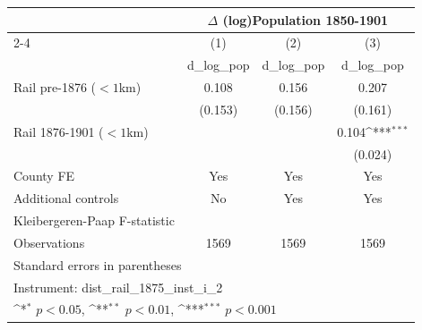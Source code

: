 {
\def\sym#1{\ifmmode^{#1}\else\(^{#1}\)\fi}
\begin{tabular}{l*{3}{c}}
\toprule
                &\multicolumn{3}{c}{$\Delta$ (log)Population 1850-1901}  \\\cmidrule(lr){2-4}
                &\multicolumn{1}{c}{(1)}&\multicolumn{1}{c}{(2)}&\multicolumn{1}{c}{(3)}\\
                &\multicolumn{1}{c}{d\_log\_pop}&\multicolumn{1}{c}{d\_log\_pop}&\multicolumn{1}{c}{d\_log\_pop}\\
\midrule
Rail pre-1876 ($<1$km)&    0.108         &    0.156         &    0.207         \\
                &  (0.153)         &  (0.156)         &  (0.161)         \\
Rail 1876-1901 ($<1$km)&                  &                  &    0.104\sym{***}\\
                &                  &                  &  (0.024)         \\
County FE       &      Yes         &      Yes         &      Yes         \\
Additional controls &       No         &      Yes         &      Yes         \\
\midrule
Kleibergeren-Paap F-statistic&                  &                  &                  \\
Observations    &     1569         &     1569         &     1569         \\
\bottomrule
\multicolumn{4}{l}{\footnotesize Standard errors in parentheses}\\
\multicolumn{4}{l}{\footnotesize Instrument: dist\_rail\_1875\_inst\_i\_2}\\
\multicolumn{4}{l}{\footnotesize \sym{*} \(p<0.05\), \sym{**} \(p<0.01\), \sym{***} \(p<0.001\)}\\
\end{tabular}
}
